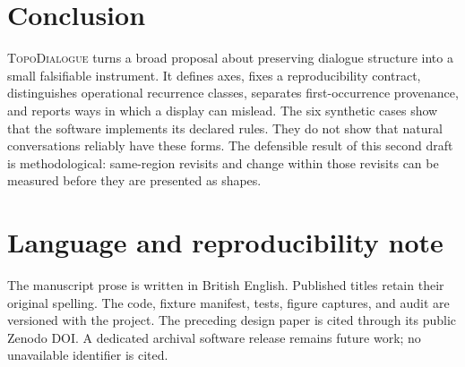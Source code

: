 \documentclass[11pt]{article}
\newcommand{\system}{\textsc{TopoDialogue}}
\begin{document}
\section{Conclusion}

\system{} turns a broad proposal about preserving dialogue structure into a
small falsifiable instrument. It defines axes, fixes a reproducibility contract,
distinguishes operational recurrence classes, separates first-occurrence
provenance, and reports ways in which a display can mislead. The six synthetic
cases show that the software implements its declared rules. They do not show
that natural conversations reliably have these forms. The defensible result of
this second draft is methodological: same-region revisits and change within
those revisits can be measured before they are presented as shapes.

\section*{Language and reproducibility note}

The manuscript prose is written in British English. Published titles retain
their original spelling. The code, fixture manifest, tests, figure captures,
and audit are versioned with the project. The preceding design paper is cited
through its public Zenodo DOI. A dedicated archival software release remains
future work; no unavailable identifier is cited.



\end{document}
